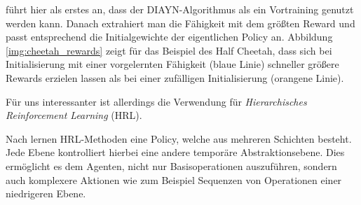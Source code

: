 \cite{diversity_eysenbach} führt hier als erstes an, dass der DIAYN-Algorithmus als ein Vortraining genutzt werden kann. Danach extrahiert man die Fähigkeit mit dem größten Reward und passt entsprechend die Initialgewichte der eigentlichen Policy an. Abbildung \ref{img:cheetah_rewards} zeigt für das Beispiel des Half Cheetah, dass sich bei Initialisierung mit einer vorgelernten Fähigkeit (blaue Linie) schneller größere Rewards erzielen lassen als bei einer zufälligen Initialisierung (orangene Linie).

\smallspace

Für uns interessanter ist allerdings die Verwendung für \textit{Hierarchisches Reinforcement Learning} (HRL). 

Nach \cite{BerliacHierachialRL2019} lernen HRL-Methoden eine Policy, welche aus mehreren Schichten besteht. Jede Ebene kontrolliert hierbei eine andere temporäre Abstraktionsebene. Dies ermöglicht es dem Agenten, nicht nur Basisoperationen auszuführen, sondern auch komplexere Aktionen wie zum Beispiel Sequenzen von Operationen einer niedrigeren Ebene.

\smallspace

